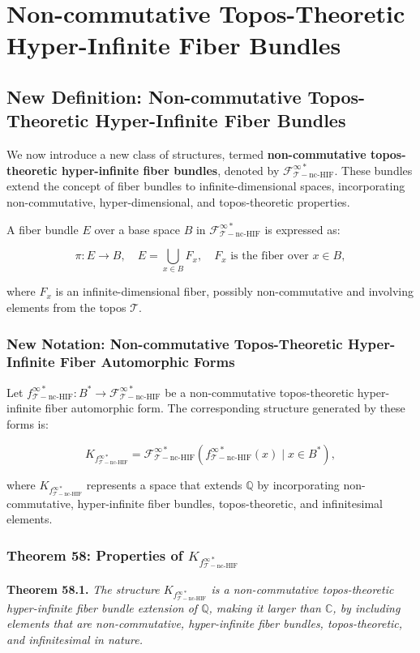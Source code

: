 \documentclass{article}
\begin{document}

\section{Non-commutative Topos-Theoretic Hyper-Infinite Fiber Bundles}
\subsection{New Definition: Non-commutative Topos-Theoretic Hyper-Infinite Fiber Bundles}
We now introduce a new class of structures, termed \textbf{non-commutative topos-theoretic hyper-infinite fiber bundles}, denoted by \(\mathcal{F}_{\mathcal{T}-\text{nc-HIF}}^{\infty *}\). These bundles extend the concept of fiber bundles to infinite-dimensional spaces, incorporating non-commutative, hyper-dimensional, and topos-theoretic properties. 

A fiber bundle \(E\) over a base space \(B\) in \(\mathcal{F}_{\mathcal{T}-\text{nc-HIF}}^{\infty *}\) is expressed as:

\[
\pi: E \to B, \quad E = \bigcup_{x \in B} F_x, \quad F_x \text{ is the fiber over } x \in B,
\]

where \(F_x\) is an infinite-dimensional fiber, possibly non-commutative and involving elements from the topos \(\mathcal{T}\).

\subsubsection{New Notation: Non-commutative Topos-Theoretic Hyper-Infinite Fiber Automorphic Forms}
Let \(f_{\mathcal{T}-\text{nc-HIF}}^{\infty *}: B^* \to \mathcal{F}_{\mathcal{T}-\text{nc-HIF}}^{\infty *}\) be a non-commutative topos-theoretic hyper-infinite fiber automorphic form. The corresponding structure generated by these forms is:

\[
K_{f_{\mathcal{T}-\text{nc-HIF}}^{\infty *}} = \mathcal{F}_{\mathcal{T}-\text{nc-HIF}}^{\infty *}(f_{\mathcal{T}-\text{nc-HIF}}^{\infty *}(x) \mid x \in B^*),
\]

where \(K_{f_{\mathcal{T}-\text{nc-HIF}}^{\infty *}}\) represents a space that extends \(\mathbb{Q}\) by incorporating non-commutative, hyper-infinite fiber bundles, topos-theoretic, and infinitesimal elements.

\subsubsection{Theorem 58: Properties of \(K_{f_{\mathcal{T}-\text{nc-HIF}}^{\infty *}}\)}
\textbf{Theorem 58.1.} \textit{The structure \(K_{f_{\mathcal{T}-\text{nc-HIF}}^{\infty *}}\) is a non-commutative topos-theoretic hyper-infinite fiber bundle extension of \(\mathbb{Q}\), making it larger than \(\mathbb{C}\), by including elements that are non-commutative, hyper-infinite fiber bundles, topos-theoretic, and infinitesimal in nature.}
\end{document}

